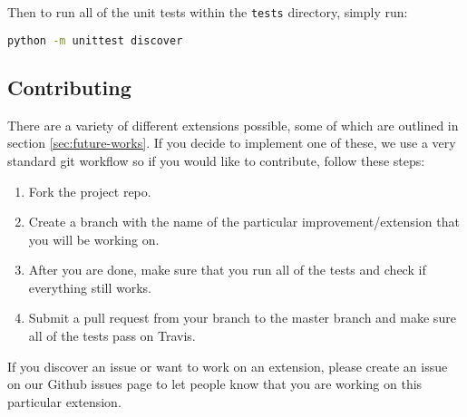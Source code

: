 Then to run all of the unit tests within the \texttt{tests} directory, simply run:
\begin{lstlisting}[language=Bash]
python -m unittest discover
\end{lstlisting}

\newpage

\subsection{Contributing}

There are a variety of different extensions possible, some of which are outlined in section \ref{sec:future-works}.
If you decide to implement one of these, we use a very standard git workflow so if you would like to contribute, follow these steps:

\begin{enumerate}
  \item Fork the project repo.
  \item Create a branch with the name of the particular improvement/extension that you will be working on.
  \item After you are done, make sure that you run all of the tests and check if everything still works.
  \item Submit a pull request from your branch to the master branch and make sure all of the tests pass on Travis.
\end{enumerate}

If you discover an issue or want to work on an extension, please create an issue on our Github issues page to let people know that you are working on this particular extension.

\endgroup
